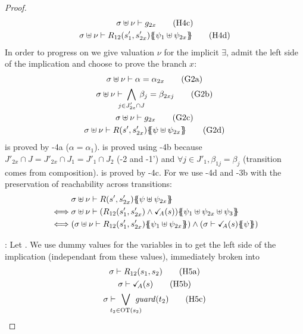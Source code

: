 \documentclass{article}
\begin{document}
\begin{proof}
\begin{gather}
		\sigma \uplus \nu \vdash g_{2x} \hyp{4c} \\
		\sigma \uplus \nu \vdash R_{12}\mpar{s'_1, s'_{2x}}\psubst{\psi_1 \uplus \psi_{2x}} \hyp{4d}
	\end{gather}
	In order to progress on  we give valuation \(\nu\) for the implicit \(\exists\), admit the left side of the implication and choose to prove the branch \(x\):
	\begin{gather}
		\sigma \uplus \nu \vdash \alpha = \alpha_{2x} \goal{2a} \\
		\sigma \uplus \nu \vdash \bigwedge_\subbox{j \in J'_{2x} \cap J} \beta_j = \beta_{2xj} \goal{2b} \\
		\sigma \uplus \nu \vdash g_{2x} \goal{2c} \\
		\sigma \uplus \nu \vdash R\mpar{s', s'_{2x}}\psubst{\psi \uplus \psi_{2x}} \goal{2d}
	\end{gather}
	 is proved by \hyp{4a} (\(\alpha = \alpha_1\)).
	 is proved using \hyp{4b} because \(J'_{2x} \cap J = J'_{2x} \cap J_1 = J'_1 \cap J_2\) (\hyp{2} and \hyp{1'}) and \(\forall j \in J'_1, \beta_{1j} = \beta_j\) (transition comes from composition).
	 is proved by \hyp{4c}.
	For  we use \hyp{4d} and \hyp{3b} with the preservation of reachability across transitions:
	\begin{align*}
		& \sigma \uplus \nu \vdash R\mpar{s', s'_{2x}}\psubst{\psi \uplus \psi_{2x}} \\
		\iff & \sigma \uplus \nu \vdash \mpar{R_{12}\mpar{s'_1, s'_{2x}} \wedge \reach{A}\mpar{s}}\psubst{\psi_1 \uplus \psi_{2x} \uplus \psi_3} \\
		\iff & \mpar{\sigma \uplus \nu \vdash R_{12}\mpar{s'_1, s'_{2x}}\psubst{\psi_1 \uplus \psi_{2x}}} \wedge \mpar{\sigma \vdash \reach{A}\mpar{s}\psubst{\psi}}
	\end{align*}
\item[\goal{1}:] 
	Let .
	We use dummy values for the variables in  to get the left side of the implication (independant from these values), immediately broken into
	\begin{gather}
		\sigma \vdash R_{12}\mpar{s_1, s_2} \hyp{5a} \\
		\sigma \vdash \reach{A}\mpar{s} \hyp{5b} \\
		\sigma \vdash \bigvee_\subbox{t_2 \in \fOT{s_2}} \fguard{t_2} \hyp{5c}
	\end{gather}

\end{proof}
\end{document}
